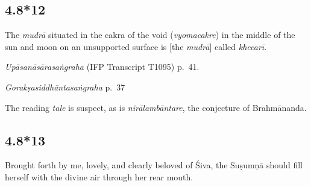 \begin{ekdosis}
\subsection*{4.8*12}
\begin{translation}[hp04_008_12]
The \emph{mudrā} situated in the cakra of the void (\emph{vyomacakre}) in the middle of the sun and moon on an unsupported surface is [the \emph{mudrā}] called \emph{khecarī}.
\end{translation}


\begin{testimonia}[hp04_008_12]
\emph{Upāsanāsārasaṅgraha} (IFP Transcript T1095) p.~41.
\begin{versinnote}
\end{versinnote}

\emph{Gorakṣasiddhāntasaṅgraha} p.~37
\begin{versinnote}
\end{versinnote}
\end{testimonia}

\begin{philcomm}[hp04_008_12]
The reading \emph{tale} is suspect, as is \emph{nirālambāntare}, the conjecture of Brahmānanda.
\end{philcomm}

\subsection*{4.8*13}
\begin{translation}[hp04_008_13]
Brought forth by me, lovely, and clearly beloved of Śiva, the Suṣumṇā should fill herself with the divine air through her rear mouth.
\end{translation}


\end{ekdosis}
